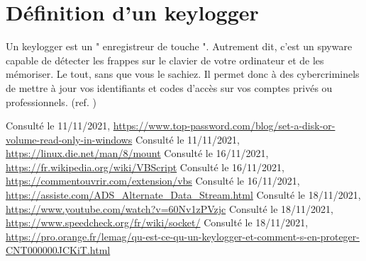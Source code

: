 \documentclass[a4paper]{article}
\begin{document}
\section{Définition d'un keylogger} \label{sec:def_keylogger}
Un keylogger est un " enregistreur de touche ". Autrement dit, c'est un spyware capable de détecter les frappes sur le clavier de votre ordinateur et de les mémoriser. Le tout, sans que vous le sachiez. Il permet donc à des cybercriminels de mettre à jour vos identifiants et codes d'accès sur vos comptes privés ou professionnels. (ref. \cite{8})








\newpage {} \listoffigures
\newpage {} \listoflistings
\newpage {}
\begin{thebibliography}{9}
 Consulté le 11/11/2021, {\small \url{https://www.top-password.com/blog/set-a-disk-or-volume-read-only-in-windows}}
 Consulté le 11/11/2021, {\small \url{https://linux.die.net/man/8/mount}}
 Consulté le 16/11/2021, {\small \url{https://fr.wikipedia.org/wiki/VBScript}}
 Consulté le 16/11/2021, {\small \url{https://commentouvrir.com/extension/vbs}}
 Consulté le 16/11/2021, {\small \url{https://assiste.com/ADS_Alternate_Data_Stream.html}}
 Consulté le 18/11/2021, {\small \url{https://www.youtube.com/watch?v=60Nv1zPVzjc}}
 Consulté le 18/11/2021, {\small \url{https://www.speedcheck.org/fr/wiki/socket/}}
 Consulté le 18/11/2021, \\{\small \url{https://pro.orange.fr/lemag/qu-est-ce-qu-un-keylogger-et-comment-s-en-proteger-CNT000000JCKiT.html}}
\end{thebibliography}
\end{document}
